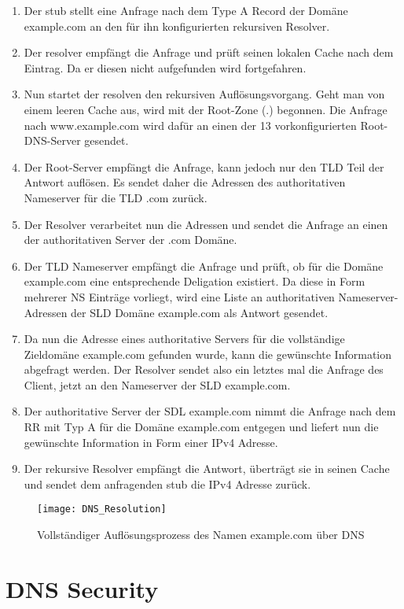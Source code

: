 \begin{enumerate}
    \item Der stub stellt eine Anfrage nach dem Type A Record der Domäne example.com an den für ihn konfigurierten rekursiven Resolver.
    \item Der resolver empfängt die Anfrage und prüft seinen lokalen Cache nach dem Eintrag. Da er diesen nicht aufgefunden wird fortgefahren.
    \item Nun startet der resolven den rekursiven Auflösungsvorgang. Geht man von einem leeren Cache aus, wird mit der Root-Zone (.) begonnen. Die Anfrage nach www.example.com wird dafür an einen der 13 vorkonfigurierten Root-DNS-Server gesendet.
    \item Der Root-Server empfängt die Anfrage, kann jedoch nur den TLD Teil der Antwort auflösen. Es sendet daher die Adressen des authoritativen Nameserver für die TLD .com zurück.
    \item Der Resolver verarbeitet nun die Adressen und sendet die Anfrage an einen der authoritativen Server der .com Domäne.
    \item Der TLD Nameserver empfängt die Anfrage und prüft, ob für die Domäne example.com eine entsprechende Deligation existiert. Da diese in Form mehrerer NS Einträge vorliegt, wird eine Liste an authoritativen Nameserver-Adressen der SLD Domäne example.com als Antwort gesendet.
    \item Da nun die Adresse eines authoritative Servers für die vollständige Zieldomäne example.com gefunden wurde, kann die gewünschte Information abgefragt werden. Der Resolver sendet also ein letztes mal die Anfrage des Client, jetzt an den Nameserver der SLD example.com.
    \item Der authoritative Server der SDL example.com nimmt die Anfrage nach dem RR mit Typ A für die Domäne example.com entgegen und liefert nun die gewünschte Information in Form einer IPv4 Adresse.
    \item Der rekursive Resolver empfängt die Antwort, überträgt sie in seinen Cache und sendet dem anfragenden stub die IPv4 Adresse zurück.
\end{enumerate}

\begin{figure}[htbp]
    \centering
    \texttt{[image: DNS\_Resolution]}
    \caption{Vollständiger Auflösungsprozess des Namen example.com über DNS }
    \label{img:dnsresolution}
\end{figure}

\section{DNS Security}
\label{sec:DNSSecurity}

